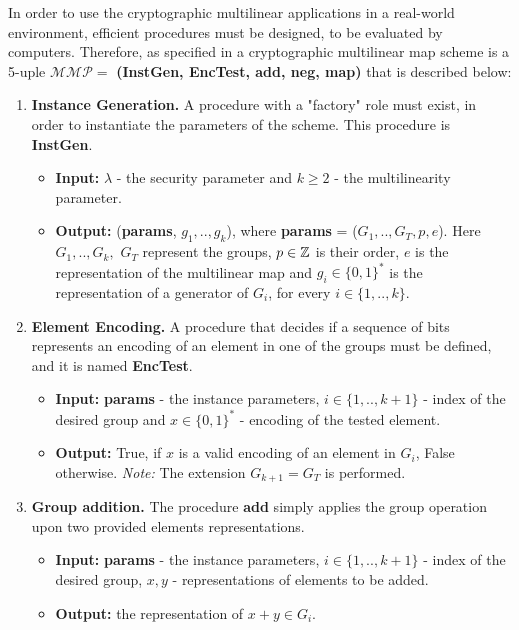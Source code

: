 In order to use the cryptographic multilinear applications in a real-world environment, efficient procedures must be designed, to be evaluated by computers. Therefore, as specified in \cite{GGH13}
a cryptographic multilinear map scheme is a 5-uple $\mathcal{MMP} = $ \textbf{(InstGen, EncTest, add, neg, map)} that is described below:
\begin{enumerate}[label=(\alph*)]
	\item \textbf{Instance Generation.}  A procedure with a "factory" role must exist, in order to instantiate the parameters of the scheme. This procedure is \textbf{InstGen}.
	\begin{itemize}
		\item \textbf{Input:} $\lambda $ - the security parameter and $k \geq 2$ - the multilinearity parameter.
		\item \textbf{Output:} (\textbf{params}, $g_1, .., g_k$), where \textbf{params} = ($G_1, .., G_T, p, e$). Here $G_1,..,G_k,$ $G_T$ represent the groups, $p\in {\mathbb Z}$ is their order, $e$ is the representation of the multilinear map and $g_i \in \{0, 1\}^*$ is the representation of a generator of $G_i$, for every $i \in \{1,..,k\}$.
	\end{itemize}


	\item \textbf{Element Encoding.} A procedure that decides if a sequence of bits represents an encoding of an element in one of the groups must be defined, and it is named \textbf{EncTest}.
		\begin{itemize}
		\item \textbf{Input:} \textbf{params} - the instance parameters, $i \in \{1,..,k+1\}$ - index of the desired group and $x\in \{0,1\}^*$ - encoding of the tested element.
		\item \textbf{Output:} True, if $x$ is a valid encoding of an element in $G_i$, False otherwise. \textit{Note:} The extension $G_{k+1} = G_T$ is performed.
	\end{itemize}


	\item \textbf{Group addition.} The procedure \textbf{add} simply applies the group operation upon two provided elements representations.
\begin{itemize}
	\item \textbf{Input:} \textbf{params} - the instance parameters, $i \in \{1,..,k+1\}$ - index of the desired group, $x,y$ - representations of elements to be added.
	\item \textbf{Output:} the representation of $x+y \in G_i$.                                     
\end{itemize}



\end{enumerate}
